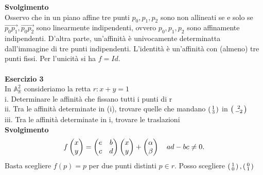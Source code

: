 \documentclass[12px]{article}
\begin{document}
\textbf{Svolgimento}\\
Osservo che in un piano affine tre punti $p_0,p_1,p_2$ sono non allineati se e solo se $\overrightarrow{p_0p_1}, \overrightarrow{p_0p_2}$ sono linearmente indipendenti, ovvero $p_0,p_1,p_2$ sono affinamente indipendenti. D'altra parte, un'affinità è univocamente determinatta dall'immagine di tre punti indipendenti. L'identità è un'affinità con (almeno) tre punti fissi. Per l'unicità si ha $f=Id$.\\
\hline \ \\
\textbf{Esercizio 3} \\
In $ \mathbb{A} ^2_ \mathbb{R}$ consideriamo la retta $r: x + y =1$\\
i. Determinare le affinità che fissano tutti i punti di r\\
ii. Tra le affinità determinate in (i), trovare quelle che mandano $ \left(\begin{smallmatrix}1\\3\end{smallmatrix}\right) $ in $\left(\begin{smallmatrix}2\\-2\end{smallmatrix}\right)$\\
iii. Tra le affinità determinate in i, trovare le traslazioni\\
\textbf{Svolgimento} \\
\[
	f\begin{pmatrix}x\\y\end{pmatrix} = \begin{pmatrix}e & b \\ c & d\end{pmatrix}\begin{pmatrix}x \\ y\end{pmatrix} + \begin{pmatrix}\alpha \\ \beta\end{pmatrix} \ \ \ ad-bc\neq 0
.\] 
Basta scegliere $f(p) = p$ per due punti distinti $p\in r$. Posso scegliere $\left(\begin{smallmatrix}1\\0\end{smallmatrix}\right), \left(\begin{smallmatrix}0\\1\end{smallmatrix}\right)$ \\
\end{document}
